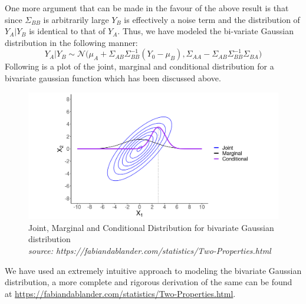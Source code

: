 \documentclass[12pt]{article}
\begin{document}
\noindent
One more argument that can be made in the favour of the above result is that since $\Sigma_{BB}$ is arbitrarily large $Y_{B}$ is effectively a noise term and the distribution of $Y_{A}|Y_{B}$ is identical to that of $Y_{A}$.
\noindent
Thus, we have modeled the bi-variate Gaussian distribution in the following manner:
 \begin{equation}
      Y_A|Y_B \sim \mathcal{N}\Biggl(\mu_A + \Sigma_{AB}\Sigma_{BB}^{-1}(Y_0-\mu_B),\Sigma_{AA}-\Sigma_{AB}\Sigma_{BB}^{-1}\Sigma_{BA}\Biggl)
 \end{equation}
 \noindent
 Following is a plot of the joint, marginal and conditional distribution for a bivariate gaussian function which has been discussed above. 
\begin{figure}[H]
     \centering
     \includegraphics[scale=0.5]{gaussian_img.png}
     \caption{Joint, Marginal and Conditional Distribution for bivariate Gaussian distribution \\ \hfill \tiny{\textit{source: {https://fabiandablander.com/statistics/Two-Properties.html}}}}
     \label{fig:my_label}
 \end{figure}
\noindent 
We have used an extremely intuitive approach to modeling the bivariate Gaussian distribution, a more complete and rigorous derivation of the same can be found at \url{https://fabiandablander.com/statistics/Two-Properties.html}.






            
\end{document}
